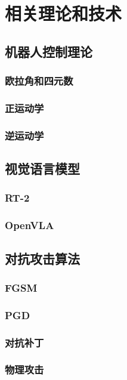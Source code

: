 \section{相关理论和技术}

\subsection{机器人控制理论}

\subsubsection{欧拉角和四元数}

\subsubsection{正运动学}

\subsubsection{逆运动学}

\subsection{视觉语言模型}

\subsubsection{RT-2}

\subsubsection{OpenVLA}

\subsection{对抗攻击算法}

\subsubsection{FGSM}

\subsubsection{PGD}

\subsubsection{对抗补丁}

\subsubsection{物理攻击}